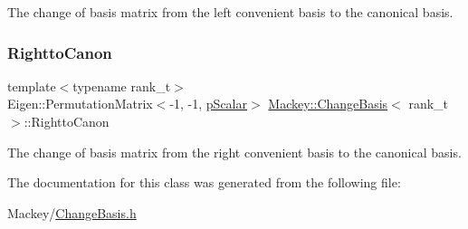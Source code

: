 The change of basis matrix from the left convenient basis to the canonical basis. 

\mbox{\label{classMackey_1_1ChangeBasis_abde8b2dd297be6e5bff1f72c2a3cd208}} 
\subsubsection{\texorpdfstring{Rightto\+Canon}{RighttoCanon}}
{\footnotesize\ttfamily template$<$typename rank\+\_\+t$>$ \\
Eigen\+::\+Permutation\+Matrix$<$-\/1, -\/1, \hyperlink{namespaceMackey_a67b5f4650ba2f166d15133a1bea2472b}{p\+Scalar}$>$ \hyperlink{classMackey_1_1ChangeBasis}{Mackey\+::\+Change\+Basis}$<$ rank\+\_\+t $>$\+::Rightto\+Canon}



The change of basis matrix from the right convenient basis to the canonical basis. 



The documentation for this class was generated from the following file\+:\begin{DoxyCompactItemize}
\item 
Mackey/\hyperlink{ChangeBasis_8h}{Change\+Basis.\+h}\end{DoxyCompactItemize}
